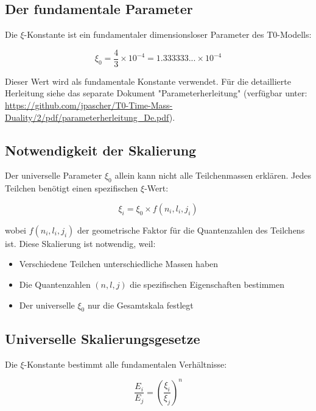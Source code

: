 \documentclass[12pt,a4paper]{report}
\begin{document}
\subsection{Der fundamentale Parameter}

Die $\xi$-Konstante ist ein fundamentaler dimensionsloser Parameter des T0-Modells:

\begin{equation}
	\boxed{\xi_0 = \frac{4}{3} \times 10^{-4} = 1.333333... \times 10^{-4}}
\end{equation}

\begin{important}
	Dieser Wert wird als fundamentale Konstante verwendet. Für die detaillierte Herleitung 
	siehe das separate Dokument "Parameterherleitung" 
	(verfügbar unter: \url{https://github.com/jpascher/T0-Time-Mass-Duality/2/pdf/parameterherleitung_De.pdf}).
\end{important}

\subsection{Notwendigkeit der Skalierung}

Der universelle Parameter $\xi_0$ allein kann nicht alle Teilchenmassen erklären. Jedes Teilchen benötigt einen spezifischen $\xi$-Wert:

\begin{equation}
	\xi_i = \xi_0 \times f(n_i, l_i, j_i)
\end{equation}

wobei $f(n_i, l_i, j_i)$ der geometrische Faktor für die Quantenzahlen des Teilchens ist. Diese Skalierung ist notwendig, weil:

\begin{itemize}
	\item Verschiedene Teilchen unterschiedliche Massen haben
	\item Die Quantenzahlen $(n, l, j)$ die spezifischen Eigenschaften bestimmen
	\item Der universelle $\xi_0$ nur die Gesamtskala festlegt
\end{itemize}

\subsection{Universelle Skalierungsgesetze}

Die $\xi$-Konstante bestimmt alle fundamentalen Verhältnisse:

\begin{equation}
	\frac{E_i}{E_j} = \left(\frac{\xi_i}{\xi_j}\right)^n
\end{equation}
\end{document}
